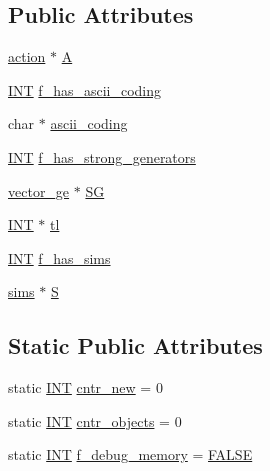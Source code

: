 \subsection*{Public Attributes}
\begin{DoxyCompactItemize}
\item 
\mbox{\hyperlink{classaction}{action}} $\ast$ \mbox{\hyperlink{classgroup_a056e73bdc68f2d6db4cd20191ef67959}{A}}
\item 
\mbox{\hyperlink{galois_8h_a09fddde158a3a20bd2dcadb609de11dc}{I\+NT}} \mbox{\hyperlink{classgroup_a5801fad79c65b35e03aef5a627ebfa7e}{f\+\_\+has\+\_\+ascii\+\_\+coding}}
\item 
char $\ast$ \mbox{\hyperlink{classgroup_a8e5590d1f87a58dbb8bf29b2bfbd91c4}{ascii\+\_\+coding}}
\item 
\mbox{\hyperlink{galois_8h_a09fddde158a3a20bd2dcadb609de11dc}{I\+NT}} \mbox{\hyperlink{classgroup_af4373173c90d12f29631e57fa2ba00d7}{f\+\_\+has\+\_\+strong\+\_\+generators}}
\item 
\mbox{\hyperlink{classvector__ge}{vector\+\_\+ge}} $\ast$ \mbox{\hyperlink{classgroup_a4a4b982f7a7348eb4951cfa806f4b3d3}{SG}}
\item 
\mbox{\hyperlink{galois_8h_a09fddde158a3a20bd2dcadb609de11dc}{I\+NT}} $\ast$ \mbox{\hyperlink{classgroup_a2e0472009d44da381602bfab8bdd28c5}{tl}}
\item 
\mbox{\hyperlink{galois_8h_a09fddde158a3a20bd2dcadb609de11dc}{I\+NT}} \mbox{\hyperlink{classgroup_a8786a3ae9dcca5f9f42b49fa6803198d}{f\+\_\+has\+\_\+sims}}
\item 
\mbox{\hyperlink{classsims}{sims}} $\ast$ \mbox{\hyperlink{classgroup_ad4e88c67171d0a3a8b07e37e6ffb758f}{S}}
\end{DoxyCompactItemize}
\subsection*{Static Public Attributes}
\begin{DoxyCompactItemize}
\item 
static \mbox{\hyperlink{galois_8h_a09fddde158a3a20bd2dcadb609de11dc}{I\+NT}} \mbox{\hyperlink{classgroup_a113a4e493d24a0aed49ffb3a8c1d4863}{cntr\+\_\+new}} = 0
\item 
static \mbox{\hyperlink{galois_8h_a09fddde158a3a20bd2dcadb609de11dc}{I\+NT}} \mbox{\hyperlink{classgroup_a5db41a2605f87b22ef4d20c9005e0527}{cntr\+\_\+objects}} = 0
\item 
static \mbox{\hyperlink{galois_8h_a09fddde158a3a20bd2dcadb609de11dc}{I\+NT}} \mbox{\hyperlink{classgroup_af9993475fdaa1439a24b2bf3124f8d63}{f\+\_\+debug\+\_\+memory}} = \mbox{\hyperlink{nauty_8h_aa93f0eb578d23995850d61f7d61c55c1}{F\+A\+L\+SE}}
\end{DoxyCompactItemize}


